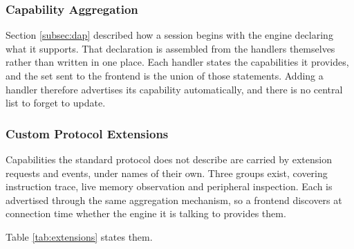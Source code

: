 \subsubsection{Capability Aggregation}
Section \ref{subsec:dap} described how a session begins with the engine declaring what it supports. That declaration is assembled from the handlers themselves rather than written in one place. Each handler states the capabilities it provides, and the set sent to the frontend is the union of those statements. Adding a handler therefore advertises its capability automatically, and there is no central list to forget to update.

\subsubsection{Custom Protocol Extensions}
Capabilities the standard protocol does not describe are carried by extension requests and events, under names of their own. Three groups exist, covering instruction trace, live memory observation and peripheral inspection. Each is advertised through the same aggregation mechanism, so a frontend discovers at connection time whether the engine it is talking to provides them.

Table \ref{tab:extensions} states them.

